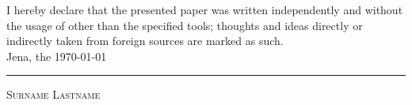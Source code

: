 I hereby declare that the presented paper was written independently and without the usage of 
other than the specified tools; thoughts and ideas directly or indirectly taken from 
foreign sources are marked as such. \\[6ex]

Jena, the \today

\rule[-0.2cm]{5cm}{0.5pt}

\textsc{Surname Lastname}